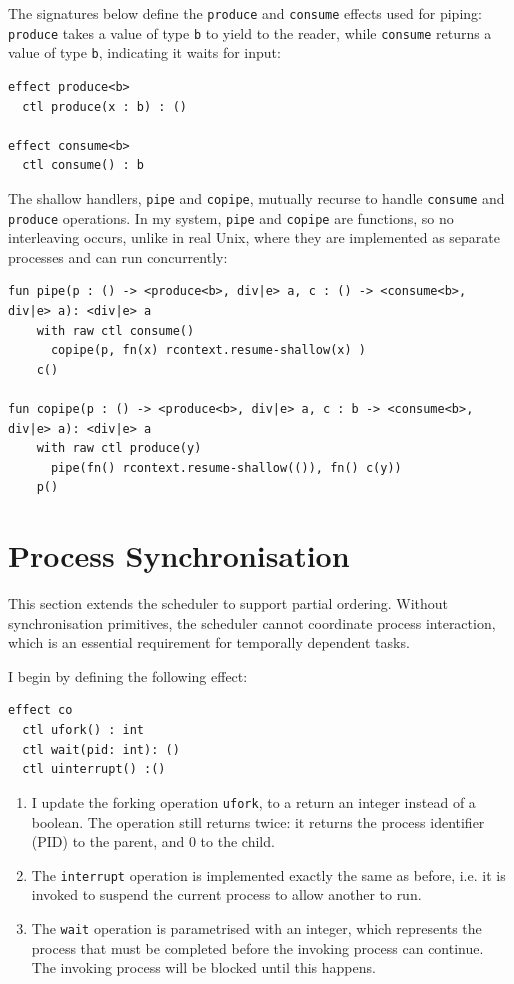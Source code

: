 \documentclass[logo,bsc,singlespacing,parskip]{infthesis}
\begin{document}
The signatures below define the \lstinline{produce} and \lstinline{consume} effects used for piping: \lstinline{produce} takes a value of type \lstinline{b} to yield to the reader, while \lstinline{consume} returns a value of type \lstinline{b}, indicating it waits for input:

\begin{lstlisting}
effect produce<b>
  ctl produce(x : b) : ()  

effect consume<b>
  ctl consume() : b         

\end{lstlisting}

The shallow handlers, \lstinline{pipe} and \lstinline{copipe}, mutually recurse to handle \lstinline{consume} and \lstinline{produce} operations. In my system, \lstinline{pipe} and \lstinline{copipe} are  functions, so no interleaving occurs, unlike in real Unix, where they are implemented as separate processes and can run concurrently:

\begin{lstlisting}
fun pipe(p : () -> <produce<b>, div|e> a, c : () -> <consume<b>, div|e> a): <div|e> a
    with raw ctl consume()
      copipe(p, fn(x) rcontext.resume-shallow(x) )
    c()

fun copipe(p : () -> <produce<b>, div|e> a, c : b -> <consume<b>, div|e> a): <div|e> a
    with raw ctl produce(y)
      pipe(fn() rcontext.resume-shallow(()), fn() c(y))
    p()

\end{lstlisting}

\section{Process Synchronisation}

This section extends the scheduler to support partial ordering. Without synchronisation primitives, the scheduler cannot coordinate process interaction, which is an essential requirement for temporally dependent tasks.


I begin by defining the following effect:
\begin{lstlisting}
effect co
  ctl ufork() : int
  ctl wait(pid: int): ()
  ctl uinterrupt() :()
\end{lstlisting}

\begin{enumerate}
    \item I update the forking operation \lstinline{ufork}, to a return an integer instead of a boolean. The operation still returns twice: it returns the process identifier (PID) to the parent, and 0 to the child. 

    \item The \lstinline{interrupt} operation is implemented exactly the same as before, i.e. it is invoked to suspend the current process to allow another to run. 

    \item The \lstinline{wait} operation is parametrised with an integer, which represents the process that must be completed before the invoking process can continue. The invoking process will be blocked until this happens.
\end{enumerate}
\end{document}
